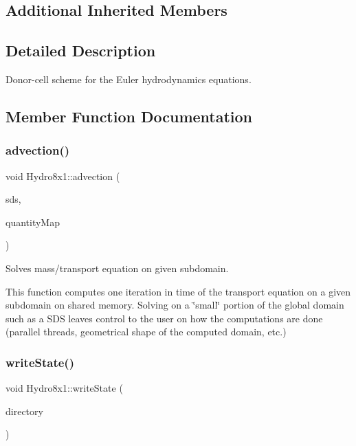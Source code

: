 \subsection*{Additional Inherited Members}


\subsection{Detailed Description}
Donor-\/cell scheme for the Euler hydrodynamics equations. 

\subsection{Member Function Documentation}
\mbox{\label{classHydro8x1_a762bfa07dad77841758e72e959cb6d22}} 
\subsubsection{\texorpdfstring{advection()}{advection()}}
{\footnotesize\ttfamily void Hydro8x1\+::advection (\begin{DoxyParamCaption}\item[{const \mbox{\hyperlink{classSDShared}{S\+D\+Shared}} \&}]{sds,  }\item[{const std\+::map$<$ std\+::string, \mbox{\hyperlink{classQuantity}{Quantity}}$<$ real $>$ $\ast$ $>$ \&}]{quantity\+Map }\end{DoxyParamCaption})}



Solves mass/transport equation on given subdomain. 

This function computes one iteration in time of the transport equation on a given subdomain on shared memory. Solving on a \char`\"{}small\char`\"{} portion of the global domain such as a S\+DS leaves control to the user on how the computations are done (parallel threads, geometrical shape of the computed domain, etc.) \mbox{\label{classHydro8x1_a475ddb381ec164a5adf8f2acc0b2802e}} 
\subsubsection{\texorpdfstring{write\+State()}{writeState()}\hspace{0.1cm}{\footnotesize\ttfamily [1/2]}}
{\footnotesize\ttfamily void Hydro8x1\+::write\+State (\begin{DoxyParamCaption}\item[{std\+::string}]{directory }\end{DoxyParamCaption})}



